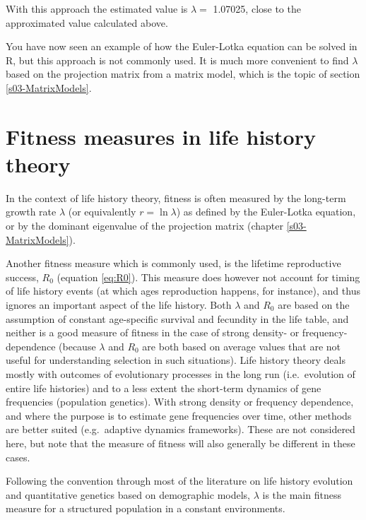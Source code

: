 \documentclass[
]{book}
\begin{document}
With this approach the estimated value is \(\lambda=\) 1.07025, close to the approximated value calculated above.

You have now seen an example of how the Euler-Lotka equation can be solved in R, but this approach is not commonly used. It is much more convenient to find \(\lambda\) based on the projection matrix from a matrix model, which is the topic of section \ref{s03-MatrixModels}.

\hypertarget{fitness-measures-in-life-history-theory}{%
\section{Fitness measures in life history theory}\label{fitness-measures-in-life-history-theory}}

In the context of life history theory, fitness is often measured by the long-term growth rate \(\lambda\) (or equivalently \(r=\ln\lambda\)) as defined by the Euler-Lotka equation, or by the dominant eigenvalue of the projection matrix (chapter \ref{s03-MatrixModels}).

Another fitness measure which is commonly used, is the lifetime reproductive success, \(R_0\) (equation \eqref{eq:R0}). This measure does however not account for timing of life history events (at which ages reproduction happens, for instance), and thus ignores an important aspect of the life history. Both \(\lambda\) and \(R_0\) are based on the assumption of constant age-specific survival and fecundity in the life table, and neither is a good measure of fitness in the case of strong density- or frequency-dependence (because \(\lambda\) and \(R_0\) are both based on average values that are not useful for understanding selection in such situations). Life history theory deals mostly with outcomes of evolutionary processes in the long run (i.e.~evolution of entire life histories) and to a less extent the short-term dynamics of gene frequencies (population genetics). With strong density or frequency dependence, and where the purpose is to estimate gene frequencies over time, other methods are better suited (e.g.~adaptive dynamics frameworks). These are not considered here, but note that the measure of fitness will also generally be different in these cases.

Following the convention through most of the literature on life history evolution and quantitative genetics based on demographic models, \(\lambda\) is the main fitness measure for a structured population in a constant environments.
\end{document}
